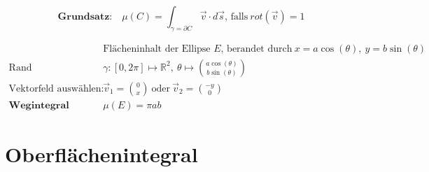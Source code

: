 \documentclass[11pt]{article}
\begin{document}
\begin{equation*}
	\textbf{Grundsatz:}\quad \mu(C) = \int_{\gamma = \partial C} \vec{v} \cdot d\vec{s}\text{, falls}\ rot(\vec{v}) = 1
\end{equation*}

\begin{equation*}
\begin{split}
	& \text{Fl{\"a}cheninhalt der Ellipse $E$, berandet durch}\ x = a\cos(\theta),\ y = b\sin(\theta) \\
	\text{Rand parametrisieren:}\quad & \gamma: [0, 2\pi] \mapsto \mathbb{R}^2,\ \theta \mapsto \binom{a\cos(\theta)}{b\sin(\theta)} \\
	\text{Vektorfeld ausw{\"a}hlen:}\quad & \vec{v}_1 = \binom{0}{x}\ \text{oder}\ \vec{v}_2 = \binom{-y}{0} \\
	\textbf{Wegintegral ausrechnen:}\quad & \mu(E) = \pi ab
\end{split}
\end{equation*}

\section{Oberflächenintegral}
\end{document}
